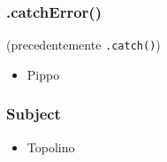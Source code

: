             \subsubsection{.catchError()}\label{subsub:catch}

            \begin{frame}{\insertsubsectionhead}{}
                \begin{block}{\texttt{\insertsubsubsectionhead} (precedentemente \texttt{.catch()})}
                    \begin{itemize}
                        \item Pippo
                    \end{itemize}
                \end{block}
            \end{frame}

            \subsubsection{Subject}\label{subsub:subject}

            \begin{frame}{\insertsubsectionhead}
                \begin{block}{\texttt{\insertsubsubsectionhead}}
                    \begin{itemize}
                        \item Topolino
                    \end{itemize}
                \end{block}
            \end{frame}

    \nocite{*}
    \section{\refname}\label{sec:ref}
    \begin{frame}[t,allowframebreaks]
        \frametitle{\insertsectionhead}
        \printbibliography
    \end{frame}

